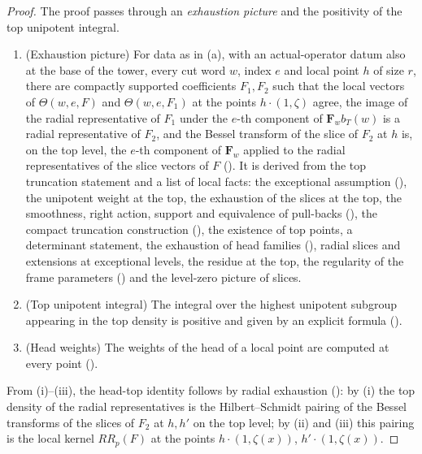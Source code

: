 \begin{proof}
The proof passes through an \emph{exhaustion picture} and the positivity of the top unipotent integral.
\begin{enumerate}[label=(\roman*)]
\item (Exhaustion picture) For data as in (a), with an actual-operator datum also at the base of the tower, every cut word
$w$, index $e$ and local point $h$ of size $r$, there are compactly supported coefficients $F_1,F_2$ such that the local vectors
of $\Theta(w,e,F)$ and $\Theta(w,e,F_1)$ at the points $h\cdot(1,\zeta)$ agree, the image of the radial representative of
$F_1$ under the $e$-th component of $\mathbf F_wb_T(w)$ is a radial representative of $F_2$, and the Bessel transform of the
slice of $F_2$ at $h$ is, on the top level, the $e$-th component of $\mathbf F_w$ applied to the radial representatives of the
slice vectors of $F$ (). It is derived from the top truncation
statement and a list of local facts: the exceptional assumption
(), the unipotent weight at the top, the exhaustion
of the slices at the top, the smoothness, right action, support and equivalence of pull-backs
(), the compact truncation construction
(), the existence of top points, a determinant
statement, the exhaustion of head families (), radial slices
and extensions at exceptional levels, the residue at the top, the regularity of the frame parameters
() and the level-zero picture of slices.
\item (Top unipotent integral) The integral over the highest unipotent subgroup appearing in the top density is positive and
given by an explicit formula ().
\item (Head weights) The weights of the head of a local point are computed at every point
().
\end{enumerate}
From (i)--(iii), the head-top identity follows by radial exhaustion
(): by (i) the top density of the radial representatives
is the Hilbert--Schmidt pairing of the Bessel transforms of the slices of $F_2$ at $h,h'$ on the top level; by (ii) and (iii)
this pairing is the local kernel $RR_p(F)$ at the points $h\cdot(1,\zeta(x))$, $h'\cdot(1,\zeta(x))$.
\end{proof}

